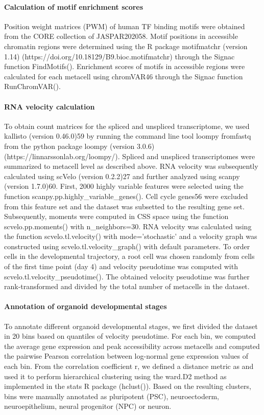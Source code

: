 \paragraph{Calculation of motif enrichment scores}
Position weight matrices (PWM) of human TF binding motifs were obtained from the CORE collection of JASPAR202058. Motif positions in accessible chromatin regions were determined using the R package motifmatchr (version 1.14) (https://doi.org/10.18129/B9.bioc.motifmatchr) through the Signac function FindMotifs(). Enrichment scores of motifs in accessible regions were calculated for each metacell using chromVAR46 through the Signac function RunChromVAR().
 
\paragraph{RNA velocity calculation}
To obtain count matrices for the spliced and unspliced transcriptome, we used kallisto (version 0.46.0)59 by running the command line tool loompy fromfastq  from the python package loompy (version 3.0.6)(https://linnarssonlab.org/loompy/). Spliced and unspliced transcriptomes were summarized to metacell level as described above. RNA velocity was subsequently calculated using scVelo (version 0.2.2)27 and further analyzed using scanpy (version 1.7.0)60. First, 2000 highly variable features were selected using the function scanpy.pp.highly\_variable\_genes(). Cell cycle genes56 were excluded from this feature set and the dataset was subsetted to the resulting gene set. Subsequently, moments were computed in CSS space using the function scvelo.pp.moments() with n\_neighbors=30. RNA velocity was calculated using the function scvelo.tl.velocity() with mode=’stochastic’ and a velocity graph was constructed using scvelo.tl.velocity\_graph() with default parameters. To order cells in the developmental trajectory, a root cell was chosen randomly from cells of the first time point (day 4) and velocity pseudotime was computed with scvelo.tl.velocity\_pseudotime().  The obtained velocity pseudotime was further rank-transformed and divided by the total number of metacells in the dataset.
 
\paragraph{Annotation of organoid developmental stages}
To annotate different organoid developmental stages, we first divided the dataset in 20 bins based on quantiles of velocity pseudotime. For each bin, we computed the average gene expression and peak accessibility across metacells and computed the pairwise Pearson correlation between log-normal gene expression values of each bin. From the correlation coefficient r, we defined a distance metric as  and used it to perform hierarchical clustering using the ward.D2 method as implemented in the stats R package (hclust()). Based on the resulting clusters, bins were manually annotated as pluripotent (PSC), neuroectoderm, neuroepithelium, neural progenitor (NPC) or neuron.
 

